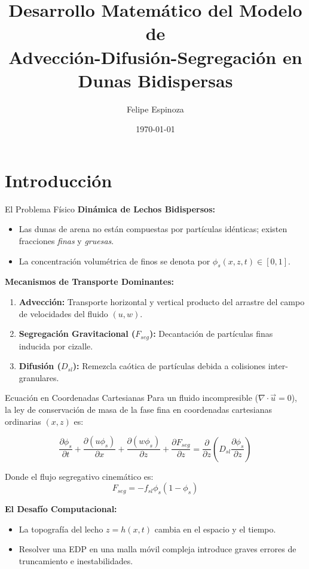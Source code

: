 \documentclass[10pt]{beamer}
\title{\textbf{Desarrollo Matemático del Modelo de\\ Advección-Difusión-Segregación en Dunas Bidispersas}}
\author{Felipe Espinoza}
\date{\today}
\begin{document}
\begin{frame}
    \titlepage
\end{frame}

\section{Introducción}

\begin{frame}{El Problema Físico}
    \textbf{Dinámica de Lechos Bidispersos:}
    \begin{itemize}
        \item Las dunas de arena no están compuestas por partículas idénticas; existen fracciones \textit{finas} y \textit{gruesas}.
        \item La concentración volumétrica de finos se denota por $\phi_s(x,z,t) \in [0,1]$.
    \end{itemize}
    \vspace{0.5cm}
    \textbf{Mecanismos de Transporte Dominantes:}
    \begin{enumerate}
        \item \textbf{Advección:} Transporte horizontal y vertical producto del arrastre del campo de velocidades del fluido $(u, w)$.
        \item \textbf{Segregación Gravitacional ($F_{seg}$):} Decantación de partículas finas inducida por cizalle.
        \item \textbf{Difusión ($D_{sl}$):} Remezcla caótica de partículas debida a colisiones inter-granulares.
    \end{enumerate}
\end{frame}

\begin{frame}{Ecuación en Coordenadas Cartesianas}
    Para un fluido incompresible ($\nabla \cdot \vec{u} = 0$), la ley de conservación de masa de la fase fina en coordenadas cartesianas ordinarias $(x,z)$ es:
    
    \begin{equation}
        \frac{\partial \phi_s}{\partial t} + \frac{\partial (u \phi_s)}{\partial x} + \frac{\partial (w \phi_s)}{\partial z} + \frac{\partial F_{seg}}{\partial z} = \frac{\partial}{\partial z} \left( D_{sl} \frac{\partial \phi_s}{\partial z} \right)
    \end{equation}
    
    Donde el flujo segregativo cinemático es:
    \begin{equation*}
        F_{seg} = -f_{sl} \phi_s (1 - \phi_s)
    \end{equation*}
    
    \textbf{El Desafío Computacional:}
    \begin{itemize}
        \item La topografía del lecho $z = h(x,t)$ cambia en el espacio y el tiempo.
        \item Resolver una EDP en una malla móvil compleja introduce graves errores de truncamiento e inestabilidades.
    \end{itemize}
\end{frame}
\end{document}

